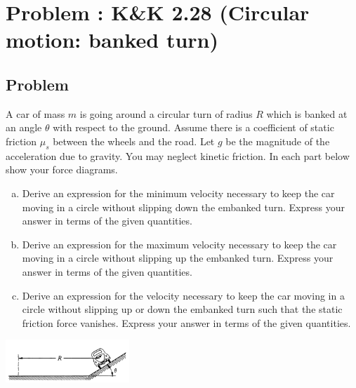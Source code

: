 \documentclass[solutions]{esg8012pset}
\begin{document}
\section{Problem \thesection: K\&K 2.28 (Circular motion: banked turn)}
\subsection{Problem}
  A car of mass $m$ is going around a circular turn of radius $R$ which is banked at an angle $\theta$ with respect to the ground. Assume there is a coefficient of static friction $\mu_s$ between the wheels and the road. Let $g$ be the magnitude of the acceleration due to gravity. You may neglect kinetic friction. In each part below show your force diagrams.
  \begin{enumerate}[a)]
    \item Derive an expression for the minimum velocity necessary to keep the car moving in a circle without slipping down the embanked turn. Express your answer in terms of the given quantities.
    \item Derive an expression for the maximum velocity necessary to keep the car moving in a circle without slipping up the embanked turn. Express your answer in terms of the given quantities.
    \item Derive an expression for the velocity necessary to keep the car moving in a circle without slipping up or down the embanked turn such that the static friction force vanishes. Express your answer in terms of the given quantities.
  \end{enumerate}
  \begin{center}\includegraphics[width=0.35\textwidth]{ps03_3}\end{center}
\end{document}
